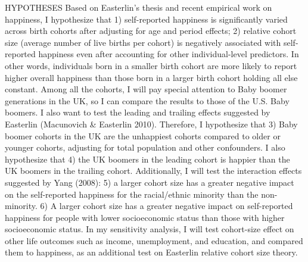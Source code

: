 HYPOTHESES
Based on Easterlin’s thesis and recent empirical work on happiness, I hypothesize that 1) self-reported happiness is significantly varied across birth cohorts after adjusting for age and period effects; 2) relative cohort size (average number of live births per cohort) is negatively associated with self-reported happiness even after accounting for other individual-level predictors. In other words, individuals born in a smaller birth cohort are more likely to report higher overall happiness than those born in a larger birth cohort holding all else constant.
Among all the cohorts, I will pay special attention to Baby boomer generations in the UK, so I can compare the results to those of the U.S. Baby boomers. I also want to test the leading and trailing effects suggested by Easterlin (Macunovich & Easterlin 2010). Therefore, I hypothesize that 3) Baby boomer cohorts in the UK are the unhappiest cohorts compared to older or younger cohorts, adjusting for total population and other confounders. I also hypothesize that 4) the UK boomers in the leading cohort is happier than the UK boomers in the trailing cohort.
Additionally, I will test the interaction effects suggested by Yang (2008): 5) a larger cohort size has a greater negative impact on the self-reported happiness for the racial/ethnic minority than the non-minority. 6) A larger cohort size has a greater negative impact on self-reported happiness for people with lower socioeconomic status than those with higher socioeconomic status. In my sensitivity analysis, I will test cohort-size effect on other life outcomes such as income, unemployment, and education, and compared them to happiness, as an additional test on Easterlin relative cohort size theory.

